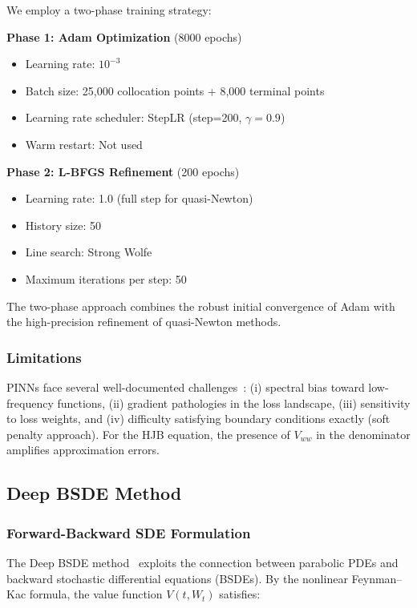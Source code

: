 \documentclass[12pt,a4paper]{article}
\begin{document}
We employ a two-phase training strategy:

\textbf{Phase 1: Adam Optimization} (8000 epochs)
\begin{itemize}
    \item Learning rate: $10^{-3}$
    \item Batch size: 25,000 collocation points + 8,000 terminal points
    \item Learning rate scheduler: StepLR (step=200, $\gamma=0.9$)
    \item Warm restart: Not used
\end{itemize}

\textbf{Phase 2: L-BFGS Refinement} (200 epochs)
\begin{itemize}
    \item Learning rate: 1.0 (full step for quasi-Newton)
    \item History size: 50
    \item Line search: Strong Wolfe
    \item Maximum iterations per step: 50
\end{itemize}

The two-phase approach combines the robust initial convergence of Adam with the high-precision refinement of quasi-Newton methods.

\subsubsection{Limitations}

PINNs face several well-documented challenges~\cite{wang2022}: (i) spectral bias toward low-frequency functions, (ii) gradient pathologies in the loss landscape, (iii) sensitivity to loss weights, and (iv) difficulty satisfying boundary conditions exactly (soft penalty approach). For the HJB equation, the presence of $V_{ww}$ in the denominator amplifies approximation errors.

\subsection{Deep BSDE Method}
\label{sec:bsde}

\subsubsection{Forward-Backward SDE Formulation}

The Deep BSDE method~\cite{han2018} exploits the connection between parabolic PDEs and backward stochastic differential equations (BSDEs). By the nonlinear Feynman--Kac formula, the value function $V(t, W_t)$ satisfies:
\end{document}
